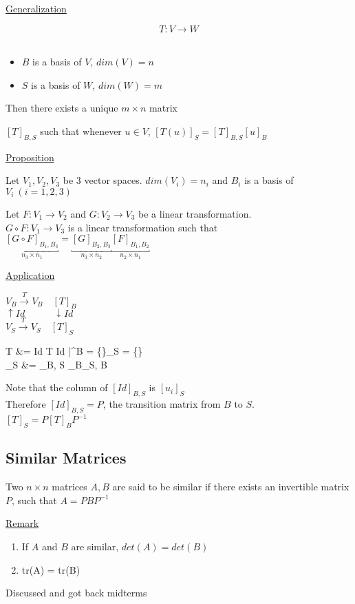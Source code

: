 \documentclass[12pt]{article}
\newenvironment{block}[1][Label]{\underline{#1}\par}{}
\newenvironment{proposition}{\block[Proposition]}{\endblock}
\newenvironment{remark}{\block[Remark]}{\endblock}
\newcommand{\uu}[1]{\underbracket{#1}}
\newcommand{\bb}[1]{\left\{#1\right\}}
\newcommand{\bbb}[1]{\left[#1\right]}
\newenvironment{eqn}{\equation\alignedat{3}}{\endalignedat\endequation}
\begin{document}
	\begin{block}[Generalization]
		$$T: V \rightarrow W$$ \\
		\begin{itemize}
			\item $B$ is a basis of $V$, $dim(V) = n$
			\item $S$ is a basis of $W$, $dim(W) = m$
		\end{itemize}
	
	Then there exists a unique $m \times n$ matrix
	
	$\bbb{T}_{B, S}$ such that whenever $u \in V$, $\bbb{T(u)}_S = \bbb{T}_{B, S} \bbb{u}_B$
	\end{block}
	
	\begin{proposition}
		Let $V_1, V_2, V_3$ be 3 vector spaces. $dim(V_i) = n_i$ and $B_i$ is a basis of $V_i \ (i = 1, 2, 3)$
		
		Let $F: V_1 \rightarrow V_2$ and $G: V_2 \rightarrow V_3$ be a linear transformation. \\ 
		$G \circ F: V_1 \rightarrow V_3$ is a linear transformation such that \\
		$\uu{\bbb{G \circ F}_{B_1, B_3}}_{n_3 \times n_1} = \uu{\bbb{G}_{B_2, B_3}}_{n_3 \times n_2} \uu{\bbb{F}_{B_1, B_2}}_{n_2 \times n_1}$
	\end{proposition}

	\pagebreak

	\begin{block}[Application]
		$V_B \xrightarrow{T} V_B \quad \bbb{T}_B$ \\
		$\uparrow Id \quad \quad \quad \downarrow Id$ \\
		$V_S \xrightarrow{T} V_S \quad \bbb{T}_S$
		
		\begin{eqn}
			T &= Id \circ T \circ Id \quad \big|^{B = \bb{\vv}}_{S = \bb{\vv[base=v]}} \\
			\bbb{T}_S &= \bbb{Id}_{B, S} \bbb{T}_B\bbb{Id}_{S, B}
		\end{eqn}
	
		Note that the column of $\bbb{Id}_{B, S}$ is $\bbb{u_i}_S$ \\
		Therefore $\bbb{Id}_{B, S} = P$, the transition matrix from $B$ to $S$. \\
		$\bbb{T}_S = P \bbb{T}_B P^{-1}$
	\end{block}
	
	\subsection{Similar Matrices}
	
	Two $n \times n$ matrices $A, B$ are said to be similar if there exists an invertible matrix $P$, such that $A = PBP^{-1}$
	
	\begin{remark}
		\begin{enumerate}
			\item If $A$ and $B$ are similar, $det(A) = det(B)$
			\item tr(A) = tr(B)
		\end{enumerate}
	\end{remark}

	Discussed and got back midterms
	
\end{document}
